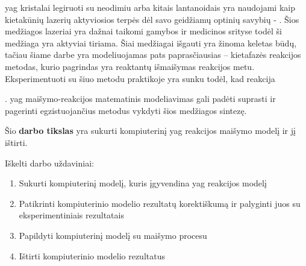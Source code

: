 




\ac{yag} kristalai legiruoti su neodimiu arba kitais lantanoidais yra naudojami kaip kietakūnių lazerių aktyviosios terpės dėl savo geidžiamų optinių savybių - \cite{?}. Šios medžiagos lazeriai yra dažnai taikomi gamybos ir medicinos srityse \cite{dubeyExperimentalStudyNd2008, valentiUseErYAG2021} todėl ši medžiaga yra aktyviai tiriama. Šiai medžiagai išgauti yra žinoma keletas būdų, tačiau šiame darbe yra modeliuojamas pats paprasčiausias -- kietafazės reakcijos metodas, kurio pagrindas yra reaktantų išmaišymas reakcijos metu. Eksperimentuoti su šiuo metodu praktikoje yra sunku todėl, kad reakcija 

. \acs{yag} maišymo-reakcijos matematinis modeliavimas gali padėti suprasti ir pagerinti egzistuojančius metodus vykdyti šios medžiagos sintezę.   


Šio \textbf{darbo tikslas} yra sukurti kompiuterinį \acs{yag} reakcijos maišymo modelį ir jį ištirti.

Iškelti darbo uždaviniai:

\begin{enumerate}
\item Sukurti kompiuterinį modelį, kuris įgyvendina \acs{yag} reakcijos modelį
\item Patikrinti kompiuterinio modelio rezultatų korektiškumą ir palyginti juos su eksperimentiniais rezultatais
\item Papildyti kompiuterinį modelį su maišymo procesu
\item Ištirti kompiuterinio modelio rezultatus
\end{enumerate}